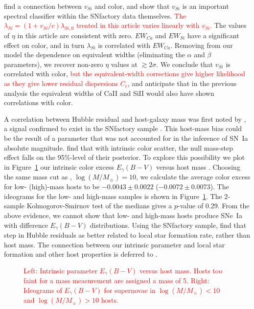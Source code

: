 \documentclass{aastex61}   	%
\begin{document}
\citet{2009ApJ...699L.139W, 2011ApJ...729...55F} find a connection between $v_{Si}$ and color, and  
\citet{2015MNRAS.447.1247S} show that $v_{Si}$ is an important spectral classifier within the SNfactory data themselves.
\textcolor{red}{The $\lambda_{Si} = (1+v_{Si}/c) \lambda_{Si,0} $ treated in this article varies linearly with $v_{Si}$.}
The values of $\eta$ in this article are consistent with zero.  $EW_{Ca}$ and $EW_{Si}$ have a significant effect on color,
and in turn $\lambda_{Si}$ is correlated with $EW_{Ca}$.
Removing from our model the dependence on equivalent widths (eliminating the  $\alpha$ and $\beta$ parameters), we recover
non-zero $\eta$ values at  $\gtrsim 2\sigma$.  We conclude that $v_{Si}$ is correlated with color, 
\textcolor{red}{but the equivalent-width corrections give higher likelihood as they give lower residual dispersions $C_c$},
and  anticipate that in the previous analysis the equivalent widths of CaII and 
SiII would also have shown correlations with color.

\color{red}
A correlation between Hubble residual and host-galaxy mass
was first noted by \citet{2010ApJ...715..743K,2010MNRAS.406..782S}, a signal confirmed to exist in the SNfactory
sample \citep{2013ApJ...770..108C}.
This host-mass bias could be the result of a parameter that was not accounted for in the inference of SN~Ia absolute magnitude.
\citet{2016arXiv160904470M} find that with intrinsic color scatter, the null mass-step effect falls on the 95\%-level of their posterior.
To explore this possibility we plot in Figure~\ref{childress:fig} our intrinsic color excess $E_\gamma(B-V)$  versus host mass 
\citep{2016rigault}.  Choosing the same mass cut as  \citet{2013ApJ...770..108C}, $\log{(M/M_\sun)}=10$, we calculate the average
color excess for low- (high)-mass hosts to be
$  -0.0043 \pm    0.0022$
($  -0.0072 \pm    0.0073$).  
The ideograms for the low- and high-mass samples is shown in Figure~\ref{childress:fig}.
The 2-sample Kolmogorov-Smirnov test of the medians gives a $p$-value of
0.29.
From the above evidence, we cannot show that low- and high-mass hosts produce SNe~Ia with difference $E_\gamma(B-V)$ distributions. 
Using the SNfactory sample,
\citet{2013A&A...560A..66R} find that step in Hubble residuals as better related to local star formation rate, rather than host mass.
The connection between our intrinsic parameter and local star formation and other host properties is deferred to
\citet{2016rigault}.
\color{black}
\begin{figure}[htbp] %
   \centering
      \caption{\textcolor{red}{Left: Intrinsic parameter $E_\gamma(B-V)$  versus host mass.  Hosts too faint for a mass measurement
      are assigned a mass of 5.
Right: Ideograms of  $E_\gamma(B-V)$ for supernovae in $\log{(M/M_\sun)}<10$ and $\log{(M/M_\sun)}>10$ hosts. 
}
   \label{childress:fig}}
\end{figure}
\end{document}
